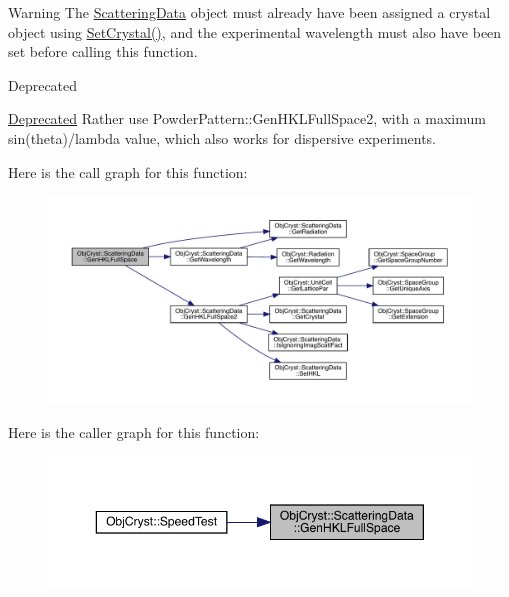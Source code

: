 \begin{DoxyWarning}{Warning}
The \mbox{\hyperlink{class_obj_cryst_1_1_scattering_data}{Scattering\+Data}} object must already have been assigned a crystal object using \mbox{\hyperlink{class_obj_cryst_1_1_scattering_data_a590a553dbea1970266a864256ebf94f3}{Set\+Crystal()}}, and the experimental wavelength must also have been set before calling this function.
\end{DoxyWarning}
\begin{DoxyRefDesc}{Deprecated}
\item[\mbox{\hyperlink{deprecated__deprecated000026}{Deprecated}}]Rather use Powder\+Pattern\+::\+Gen\+H\+K\+L\+Full\+Space2, with a maximum sin(theta)/lambda value, which also works for dispersive experiments. \end{DoxyRefDesc}
Here is the call graph for this function\+:
\nopagebreak
\begin{figure}[H]
\begin{center}
\leavevmode
\includegraphics[width=350pt]{class_obj_cryst_1_1_scattering_data_a3d15ed5e447e6b2ff6fd8fdaad43a37d_cgraph}
\end{center}
\end{figure}
Here is the caller graph for this function\+:
\nopagebreak
\begin{figure}[H]
\begin{center}
\leavevmode
\includegraphics[width=350pt]{class_obj_cryst_1_1_scattering_data_a3d15ed5e447e6b2ff6fd8fdaad43a37d_icgraph}
\end{center}
\end{figure}
\mbox{\label{class_obj_cryst_1_1_scattering_data_a63f682dfda2e03f2ab00826c5e116033}} 
